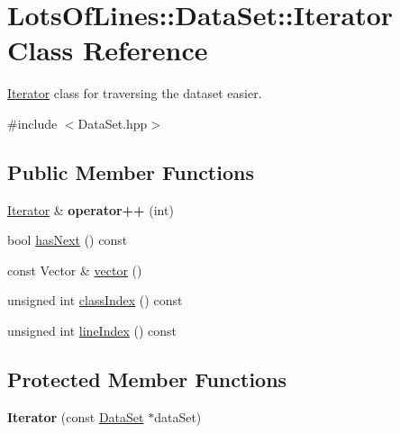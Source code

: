 \hypertarget{class_lots_of_lines_1_1_data_set_1_1_iterator}{}\section{Lots\+Of\+Lines\+:\+:Data\+Set\+:\+:Iterator Class Reference}
\label{class_lots_of_lines_1_1_data_set_1_1_iterator}


\hyperlink{class_lots_of_lines_1_1_data_set_1_1_iterator}{Iterator} class for traversing the dataset easier.  




{\ttfamily \#include $<$Data\+Set.\+hpp$>$}

\subsection*{Public Member Functions}
\begin{DoxyCompactItemize}
\item 
\hyperlink{class_lots_of_lines_1_1_data_set_1_1_iterator}{Iterator} \& {\bfseries operator++} (int)\hypertarget{class_lots_of_lines_1_1_data_set_1_1_iterator_a27ecd81fbc84de916319afb95b9397fc}{}\label{class_lots_of_lines_1_1_data_set_1_1_iterator_a27ecd81fbc84de916319afb95b9397fc}

\item 
bool \hyperlink{class_lots_of_lines_1_1_data_set_1_1_iterator_a560719900b7c83fa0863061614b3d38b}{has\+Next} () const 
\item 
const Vector \& \hyperlink{class_lots_of_lines_1_1_data_set_1_1_iterator_a986cb3be36d6d3dd3dc59ca1db5f7fb5}{vector} ()
\item 
unsigned int \hyperlink{class_lots_of_lines_1_1_data_set_1_1_iterator_ac76ed57d62efaecfc1baf1c3b831eae5}{class\+Index} () const 
\item 
unsigned int \hyperlink{class_lots_of_lines_1_1_data_set_1_1_iterator_a309c1a1a53f80c764e4d77f15ba7c171}{line\+Index} () const 
\end{DoxyCompactItemize}
\subsection*{Protected Member Functions}
\begin{DoxyCompactItemize}
\item 
{\bfseries Iterator} (const \hyperlink{class_lots_of_lines_1_1_data_set}{Data\+Set} $\ast$data\+Set)\hypertarget{class_lots_of_lines_1_1_data_set_1_1_iterator_ab697d4871ed39b319956e903104c90a3}{}\label{class_lots_of_lines_1_1_data_set_1_1_iterator_ab697d4871ed39b319956e903104c90a3}

\end{DoxyCompactItemize}
